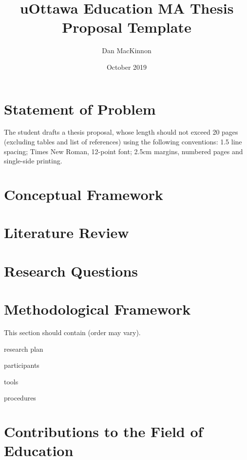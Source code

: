 \documentclass[
doc, 
biblatex,
12pt
]{apa6}
\title{uOttawa Education MA Thesis Proposal Template}
\author{Dan MacKinnon}
\date{October 2019}
\affiliation{University of Ottawa}
\begin{document}
\maketitle

\section{Statement of Problem}
The student drafts a thesis proposal, whose length should not exceed 20 pages (excluding tables and list of references) using the following conventions: 1.5 line spacing; Times New Roman, 12-point font; 2.5cm margins, numbered pages and single-side printing.

\section{Conceptual Framework}
\lipsum[1]

\section{Literature Review}
\lipsum[2]

\section{Research Questions}
\lipsum[3]

\section{Methodological Framework}
This section should contain (order may vary).

\begin{APAitemize}
\item research plan
\item participants
\item tools
\item procedures
\end{APAitemize}


\section{Contributions to the Field of Education}
\lipsum[4]

\printbibliography
\end{document}
